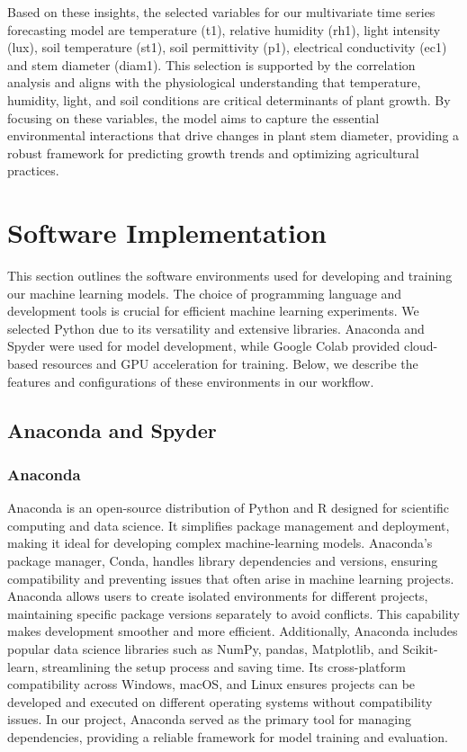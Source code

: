 Based on these insights, the selected variables for our multivariate time series forecasting model are temperature (t1), relative humidity (rh1), light intensity (lux), soil temperature (st1), soil permittivity (p1), electrical conductivity (ec1) and stem diameter (diam1). This selection is supported by the correlation analysis and aligns with the physiological understanding that temperature, humidity, light, and soil conditions are critical determinants of plant growth. By focusing on these variables, the model aims to capture the essential environmental interactions that drive changes in plant stem diameter, providing a robust framework for predicting growth trends and optimizing agricultural practices.


\section{Software Implementation}

This section outlines the software environments used for developing and training our machine learning models. The choice of programming language and development tools is crucial for efficient machine learning experiments. We selected Python due to its versatility and extensive libraries. Anaconda and Spyder were used for model development, while Google Colab provided cloud-based resources and GPU acceleration for training. Below, we describe the features and configurations of these environments in our workflow.

\subsection{Anaconda and Spyder}

\subsubsection{Anaconda}

Anaconda is an open-source distribution of Python and R designed for scientific computing and data science. It simplifies package management and deployment, making it ideal for developing complex machine-learning models. Anaconda's package manager, Conda, handles library dependencies and versions, ensuring compatibility and preventing issues that often arise in machine learning projects. Anaconda allows users to create isolated environments for different projects, maintaining specific package versions separately to avoid conflicts. This capability makes development smoother and more efficient. Additionally, Anaconda includes popular data science libraries such as NumPy, pandas, Matplotlib, and Scikit-learn, streamlining the setup process and saving time. Its cross-platform compatibility across Windows, macOS, and Linux ensures projects can be developed and executed on different operating systems without compatibility issues. In our project, Anaconda served as the primary tool for managing dependencies, providing a reliable framework for model training and evaluation.

